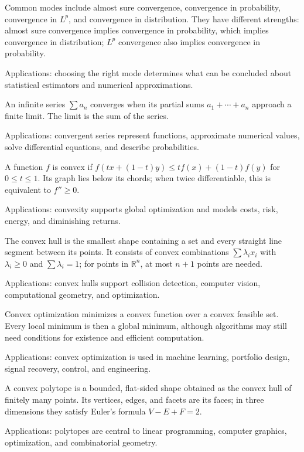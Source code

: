 Common modes include almost sure convergence, convergence in probability, convergence in $L^p$, and convergence in distribution. They have different strengths: almost sure convergence implies convergence in probability, which implies convergence in distribution; $L^p$ convergence also implies convergence in probability. \par\noindent Applications: choosing the right mode determines what can be concluded about statistical estimators and numerical approximations.

An infinite series $\sum a_n$ converges when its partial sums $a_1+\cdots+a_n$ approach a finite limit. The limit is the sum of the series. \par\noindent Applications: convergent series represent functions, approximate numerical values, solve differential equations, and describe probabilities.

A function $f$ is convex if $f(tx+(1-t)y)\le tf(x)+(1-t)f(y)$ for $0\le t\le1$. Its graph lies below its chords; when twice differentiable, this is equivalent to $f''\ge0$. \par\noindent Applications: convexity supports global optimization and models costs, risk, energy, and diminishing returns.

The convex hull is the smallest shape containing a set and every straight line segment between its points. It consists of convex combinations $\sum\lambda_i x_i$ with $\lambda_i\ge0$ and $\sum\lambda_i=1$; for points in $\mathbb R^n$, at most $n+1$ points are needed. \par\noindent Applications: convex hulls support collision detection, computer vision, computational geometry, and optimization.

Convex optimization minimizes a convex function over a convex feasible set. Every local minimum is then a global minimum, although algorithms may still need conditions for existence and efficient computation. \par\noindent Applications: convex optimization is used in machine learning, portfolio design, signal recovery, control, and engineering.

A convex polytope is a bounded, flat-sided shape obtained as the convex hull of finitely many points. Its vertices, edges, and facets are its faces; in three dimensions they satisfy Euler's formula $V-E+F=2$. \par\noindent Applications: polytopes are central to linear programming, computer graphics, optimization, and combinatorial geometry.

